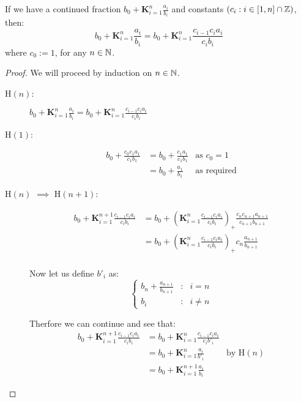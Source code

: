 \begin{equiv cont frac}
\label{THM_"equiv cont frac}
If we have a continued fraction \(b_0 + \mathbf{K}_{i=1}^n\frac{a_i}{b_i}\) and constants \((c_i : i \in [1, n] \cap \mathbb{Z})\), then:
\[b_0 + \mathbf{K}_{i=1}^n\frac{a_i}{b_i} = b_0 + \mathbf{K}_{i=1}^n\frac{c_{i-1}c_ia_i}{c_ib_i}\]
where \(c_0 := 1\), for any \(n \in \mathbb{N}\).
\end{equiv cont frac}
\begin{proof}
We will proceed by induction on \(n \in \mathbb{N}\).\\
\begin{description}
\item[\textrm{H\((n)\):}] \(b_0 + \mathbf{K}_{i=1}^n\frac{a_i}{b_i} = b_0 + \mathbf{K}_{i=1}^n\frac{c_{i-1}c_ia_i}{c_ib_i}\)
\item[\textrm{H\((1)\):}]
	\begin{align*}
		b_0 + \frac{c_0c_1a_1}{c_1b_1} 
			&= b_0 + \frac{c_1a_1}{c_1b_1} &\textrm{as \(c_0 = 1\)}\\
			&= b_0 + \frac{a_1}{b_1} &\textrm{as required}
	\end{align*}
\item[\textrm{H\((n)\) \(\implies\) H\((n+1)\):}]
	\begin{align*}
		b_0 + \mathbf{K}_{i=1}^{n+1}\frac{c_{i-1}c_ia_i}{c_ib_i}
			&= b_0 + \left(\mathbf{K}_{i=1}^n
				\frac{c_{i-1}c_ia_i}{c_ib_i}\right)_+
				\frac{c_nc_{n+1}a_{n+1}}{c_{n+1}b_{n+1}}\\
			&= b_0 + \left(\mathbf{K}_{i=1}^n
				\frac{c_{i-1}c_ia_i}{c_ib_i}\right)_+
				c_n\frac{a_{n+1}}{b_{n+1}}\\
	\end{align*}

Now let us define \(b'_i\) as:
\begin{displaymath}
\left\{
	\begin{array}{lcl}
		b_n + \frac{a_{n+1}}{b_{n+1}} &:& i = n\\
		b_i &:& i \neq n
	\end{array}
\right.
\end{displaymath}

Therfore we can continue and see that:
	\begin{align*}
		b_0 + \mathbf{K}_{i=1}^{n+1}\frac{c_{i-1}c_ia_i}{c_ib_i}
			&= b_0 + \mathbf{K}_{i=1}^n\frac{c_{i-1}c_ia_i}{c_ib'_i}\\
			&= b_0 + \mathbf{K}_{i=1}^n \frac{a_i}{b'_i}
				&\textrm{by H\((n)\)}\\
			&= b_0 + \mathbf{K}_{i=1}^{n+1}\frac{a_i}{b_i}
	\end{align*}
\end{description}
\end{proof}

